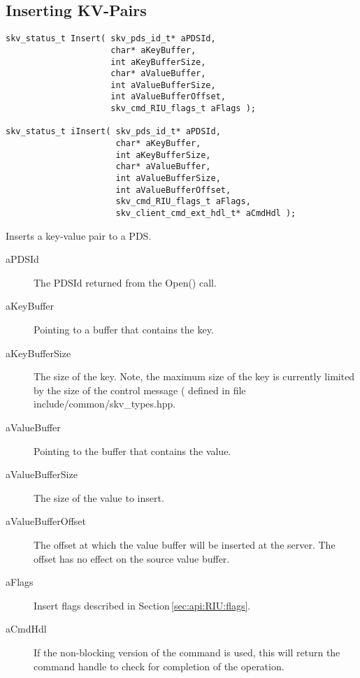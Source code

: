 \subsection{Inserting KV-Pairs}\label{sec:api:insert}

\begin{lstlisting}
skv_status_t Insert( skv_pds_id_t* aPDSId,
                     char* aKeyBuffer,
                     int aKeyBufferSize,
                     char* aValueBuffer,
                     int aValueBufferSize,
                     int aValueBufferOffset,
                     skv_cmd_RIU_flags_t aFlags );

skv_status_t iInsert( skv_pds_id_t* aPDSId,
                      char* aKeyBuffer,
                      int aKeyBufferSize,
                      char* aValueBuffer,
                      int aValueBufferSize,
                      int aValueBufferOffset,
                      skv_cmd_RIU_flags_t aFlags,
                      skv_client_cmd_ext_hdl_t* aCmdHdl );
\end{lstlisting}

Inserts a key-value pair to a PDS.
\begin{description}
\item[aPDSId] The PDSId returned from the Open() call.
\item[aKeyBuffer] Pointing to a buffer that contains the key.
\item[aKeyBufferSize] The size of the key.  Note, the maximum size of
  the key is currently limited by the size of the control message
  ( defined in file
  include/common/skv\_types.hpp.
\item[aValueBuffer] Pointing to the buffer that contains the value.
\item[aValueBufferSize] The size of the value to insert.
\item[aValueBufferOffset] The offset at which the value buffer will be
  inserted at the server.  The offset has no effect on the source
  value buffer.
\item[aFlags] Insert flags described in Section\,\ref{sec:api:RIU:flags}.
\item[aCmdHdl] If the non-blocking version of the command is used,
  this will return the command handle to check for completion of the
  operation.
\end{description}


